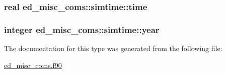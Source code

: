 \subsubsection[{\texorpdfstring{time}{time}}]{\setlength{\rightskip}{0pt plus 5cm}real ed\+\_\+misc\+\_\+coms\+::simtime\+::time}\hypertarget{structed__misc__coms_1_1simtime_af1edf430fdbca01a520e8d813d6f769a}{}\label{structed__misc__coms_1_1simtime_af1edf430fdbca01a520e8d813d6f769a}
\subsubsection[{\texorpdfstring{year}{year}}]{\setlength{\rightskip}{0pt plus 5cm}integer ed\+\_\+misc\+\_\+coms\+::simtime\+::year}\hypertarget{structed__misc__coms_1_1simtime_aa33c38e2a4be886fb46a0b41fc3614a9}{}\label{structed__misc__coms_1_1simtime_aa33c38e2a4be886fb46a0b41fc3614a9}


The documentation for this type was generated from the following file\+:\begin{DoxyCompactItemize}
\item 
\hyperlink{ed__misc__coms_8f90}{ed\+\_\+misc\+\_\+coms.\+f90}\end{DoxyCompactItemize}
